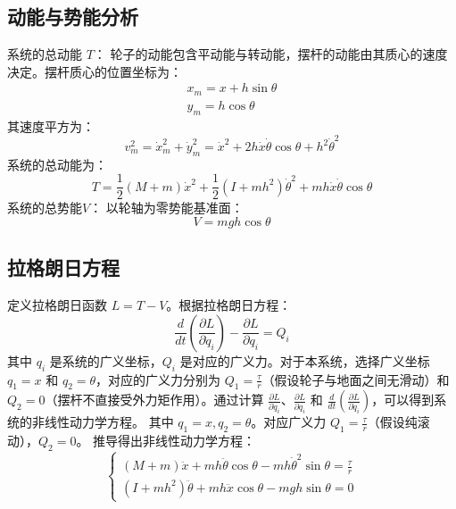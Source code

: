 \subsection{动能与势能分析}
系统的总动能 $T$：
轮子的动能包含平动能与转动能，摆杆的动能由其质心的速度决定。摆杆质心的位置坐标为：
\begin{equation}
  \begin{aligned}
    x_m = x + h\sin\theta \\
    y_m = h\cos\theta
  \end{aligned}
\end{equation}
其速度平方为：
\begin{equation}
v_m^2 = \dot{x}_m^2 + \dot{y}_m^2 = \dot{x}^2 + 2h\dot{x}\dot{\theta}\cos\theta + h^2\dot{\theta}^2
\end{equation}
系统的总动能为：
\begin{equation}
T = \frac{1}{2}(M+m)\dot{x}^2 + \frac{1}{2}(I + mh^2)\dot{\theta}^2 + mh\dot{x}\dot{\theta}\cos\theta
\end{equation}
系统的总势能$V$：
以轮轴为零势能基准面：
\begin{equation}
V = mgh\cos\theta
\end{equation}

\subsection{拉格朗日方程}
定义拉格朗日函数 $L = T - V$。根据拉格朗日方程：
\begin{equation}
\frac{d}{dt}\left(\frac{\partial L}{\partial \dot{q}_i}\right) - \frac{\partial L}{\partial q_i} = Q_i
\end{equation}
其中 $q_i$ 是系统的广义坐标，$Q_i$ 是对应的广义力。对于本系统，选择广义坐标 $q_1 = x$ 和 $q_2 = \theta$，对应的广义力分别为 $Q_1 = \frac{\tau}{r}$（假设轮子与地面之间无滑动）和 $Q_2 = 0$（摆杆不直接受外力矩作用）。通过计算 $\frac{\partial L}{\partial \dot{q}_i}$、$\frac{\partial L}{\partial q_i}$ 和 $\frac{d}{dt}\left(\frac{\partial L}{\partial \dot{q}_i}\right)$，可以得到系统的非线性动力学方程。
其中 $q_1 = x, q_2 = \theta$。对应广义力 $Q_1 = \frac{\tau}{r}$（假设纯滚动），$Q_2 = 0$。
推导得出非线性动力学方程：
\begin{equation}
\begin{cases}
(M + m)\ddot{x} + mh\ddot{\theta}\cos\theta - mh\dot{\theta}^2\sin\theta = \frac{\tau}{r} \\
(I + mh^2)\ddot{\theta} + mh\ddot{x}\cos\theta - mgh\sin\theta = 0
\end{cases}
\end{equation}

